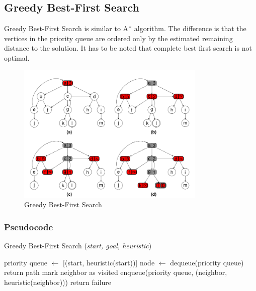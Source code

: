 \subsection{Greedy Best-First Search}
\noindent Greedy Best-First Search is similar to A* algorithm. The difference is that the vertices in the priority queue are ordered only by the estimated remaining distance to the solution. It has to be noted that complete best first search is not optimal.

\begin{figure}[H]
	\centering
	\includegraphics[width=0.8\textwidth]{./imgs/gbfs.png}
	\caption{Greedy Best-First Search}
	\label{fig:GBFS}
\end{figure}

\subsubsection{Pseudocode}
\begin{algorithm}[H]
	\caption{Greedy Best-First Search (\textit{start, goal, heuristic})}
	\label{alg:gbfs}
	\begin{algorithmic}[1]
		\State priority queue \(\gets\) [(start, heuristic(start))]
		\State node \(\gets\) dequeue(priority queue)
		\State return path
		\EndIf
		\State mark neighbor as visited
		\State enqueue(priority queue, (neighbor, heuristic(neighbor)))
		\EndIf
		\EndFor
		\EndWhile
		\State return failure
	\end{algorithmic}
\end{algorithm}

